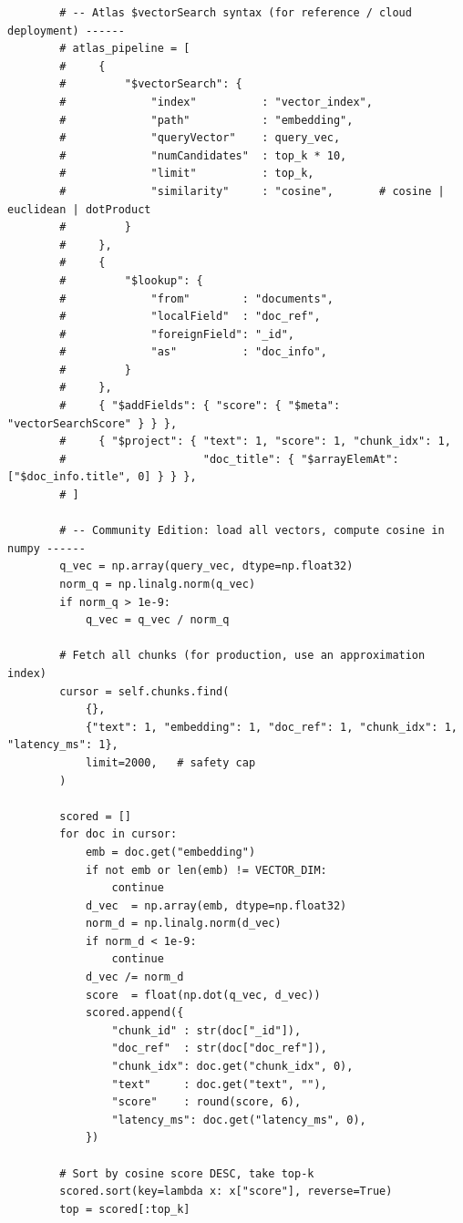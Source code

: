 \documentclass[12pt,a4paper]{report}
\begin{document}
\begin{lstlisting}
        # -- Atlas $vectorSearch syntax (for reference / cloud deployment) ------
        # atlas_pipeline = [
        #     {
        #         "$vectorSearch": {
        #             "index"          : "vector_index",
        #             "path"           : "embedding",
        #             "queryVector"    : query_vec,
        #             "numCandidates"  : top_k * 10,
        #             "limit"          : top_k,
        #             "similarity"     : "cosine",       # cosine | euclidean | dotProduct
        #         }
        #     },
        #     {
        #         "$lookup": {
        #             "from"        : "documents",
        #             "localField"  : "doc_ref",
        #             "foreignField": "_id",
        #             "as"          : "doc_info",
        #         }
        #     },
        #     { "$addFields": { "score": { "$meta": "vectorSearchScore" } } },
        #     { "$project": { "text": 1, "score": 1, "chunk_idx": 1,
        #                     "doc_title": { "$arrayElemAt": ["$doc_info.title", 0] } } },
        # ]

        # -- Community Edition: load all vectors, compute cosine in numpy ------
        q_vec = np.array(query_vec, dtype=np.float32)
        norm_q = np.linalg.norm(q_vec)
        if norm_q > 1e-9:
            q_vec = q_vec / norm_q

        # Fetch all chunks (for production, use an approximation index)
        cursor = self.chunks.find(
            {},
            {"text": 1, "embedding": 1, "doc_ref": 1, "chunk_idx": 1, "latency_ms": 1},
            limit=2000,   # safety cap
        )

        scored = []
        for doc in cursor:
            emb = doc.get("embedding")
            if not emb or len(emb) != VECTOR_DIM:
                continue
            d_vec  = np.array(emb, dtype=np.float32)
            norm_d = np.linalg.norm(d_vec)
            if norm_d < 1e-9:
                continue
            d_vec /= norm_d
            score  = float(np.dot(q_vec, d_vec))
            scored.append({
                "chunk_id" : str(doc["_id"]),
                "doc_ref"  : str(doc["doc_ref"]),
                "chunk_idx": doc.get("chunk_idx", 0),
                "text"     : doc.get("text", ""),
                "score"    : round(score, 6),
                "latency_ms": doc.get("latency_ms", 0),
            })

        # Sort by cosine score DESC, take top-k
        scored.sort(key=lambda x: x["score"], reverse=True)
        top = scored[:top_k]


\end{lstlisting}
\end{document}
